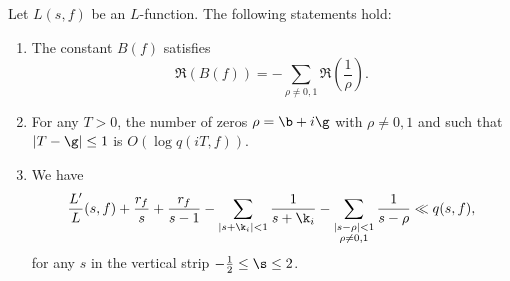     \begin{lemma}\label{lem:powerful_L-function_approximation_lemma}
      Let $L(s,f)$ be an $L$-function. The following statements hold:
      \begin{enumerate}[label=(\roman*)]
        \item The constant $B(f)$ satisfies
        \[
          \Re(B(f)) = -\sum_{\rho \neq 0,1}\Re\left(\frac{1}{\rho}\right).
        \]
        \item For any $T > 0$, the number of zeros $\rho = \b+i\g$ with $\rho \neq 0,1$ and such that $|T-\g| \le 1$ is $O(\log{q(iT,f)})$.
        \item We have
        \[
          \frac{L'}{L}(s,f)+\frac{r_{f}}{s}+\frac{r_{f}}{s-1}-\sum_{|s+\k_{i}| < 1}\frac{1}{s+\k_{i}}-\sum_{\substack{|s-\rho| < 1 \\ \rho \neq 0,1}}\frac{1}{s-\rho} \ll q(s,f),
        \]
        for any $s$ in the vertical strip $-\frac{1}{2} \le \s \le 2$.
      \end{enumerate}
    \end{lemma}
